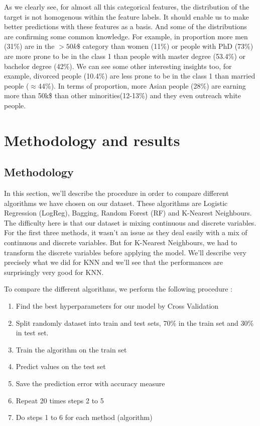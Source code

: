 \documentclass[11pt]{article}
\begin{document}
As we clearly see, for almost all this categorical features, the distribution of the target is not homogenous within the feature labels. It should enable us to make better predictions with these features as a basis. And some of the distributions are confirming some common knowledge. For example, in proportion more men (31\%) are in the $>50k\$$ category than women (11\%) or people with PhD (73\%) are more prone to be in the class 1 than people with master degree (53.4\%) or bachelor degree (42\%).
We can see some other interesting insights too, for example, divorced people (10.4\%) are less prone to be in the class 1 than married people ($\approx$44\%). In terms of proportion, more Asian people (28\%) are earning more than 50k\$ than other minorities(12-13\%) and they even outreach white people. 
\section{Methodology and results}
\subsection{Methodology}
In this section, we'll describe the procedure in order to compare different algorithms we have chosen on our dataset. These algorithms are Logistic Regression (LogReg), Bagging, Random Forest (RF) and K-Nearest Neighbours. 
The difficulty here is that our dataset is mixing continuous and discrete variables. For the first three methods, it wasn't an issue as they deal easily with a mix of continuous and discrete variables. But for K-Nearest Neighbours, we had to transform the discrete variables before applying the model. We'll describe very precisely what we did for KNN and we'll see that the performances are surprisingly very good for KNN. 


To compare the different algorithms, we perform the following procedure :

\begin{enumerate}
\item Find the best hyperparameters for our model by Cross Validation
\item Split randomly dataset into train and test sets, 70\% in the train set and 30\% in
test set.
\item Train the algorithm on the train set
\item Predict values on the test set
\item Save the prediction error with accuracy measure
\item Repeat 20 times steps 2 to 5
\item Do steps 1 to 6 for each method (algorithm)

\end{enumerate}
\newpage
\end{document}
